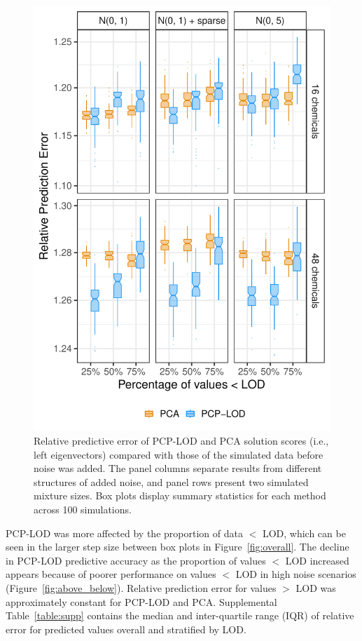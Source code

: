 \begin{figure}
    \centering
\includegraphics[width=.75\textwidth]{figures/svd_boxplots_left.pdf}
   \caption{Relative predictive error of PCP-LOD and PCA solution scores (i.e., left eigenvectors) compared with those of the simulated data before noise was added. The panel columns separate results from different structures of added noise, and panel rows present two simulated mixture sizes. Box plots display summary statistics for each method across 100 simulations.}
    \label{fig:svd}
\end{figure}

PCP-LOD was more affected by the proportion of data $<$ LOD, which can be seen in the larger step size between box plots in Figure~\ref{fig:overall}. The decline in PCP-LOD predictive accuracy as the proportion of values $<$ LOD increased appears because of poorer performance on values $<$ LOD in high noise scenarios (Figure~\ref{fig:above_below}). Relative prediction error for values $>$ LOD was approximately constant for PCP-LOD and PCA. Supplemental Table~\ref{table:supp} contains the median and inter-quartile range (IQR) of relative error for predicted values overall and stratified by LOD.

